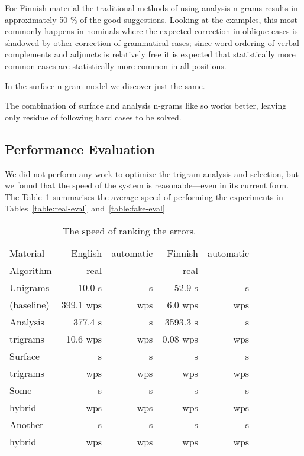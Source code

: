 \documentclass{llncs}
\begin{document}
For Finnish material the traditional methods of using analysis n-grams results
in approximately 50 \% of the good suggestions. Looking at the examples, this
most commonly happens in nominals where the expected correction in oblique
cases is shadowed by other correction of grammatical cases; since word-ordering
of verbal complements and adjuncts is relatively free it is expected that
statistically more common cases are statistically more common in all positions.

In the surface n-gram model we discover just the same.

The combination of surface and analysis n-grams like so works better, leaving
only residue of following hard cases to be solved.

\subsection{Performance Evaluation}

We did not perform any work to optimize the trigram analysis and selection,
but we found that the speed of the system is reasonable---even in its current
form. The Table~\ref{table:speed-eval} summarises the average
speed of performing the experiments in Tables~\ref{table:real-eval}~and~\ref{table:fake-eval}

\begin{table}[h]
    \caption{The speed of ranking the errors.
    \label{table:speed-eval}}
  \begin{center}
    \begin{scriptsize}
      \begin{tabular}{lrrrr}
        \hline
        Material  & English & automatic & Finnish & automatic \\
        Algorithm & real    &           & real    &           \\
        \hline
        Unigrams   &    10.0 s &      s & 52.9 s &     s  \\
        (baseline) & 399.1 wps &    wps & 6.0 wps &   wps  \\
        \hline
        Analysis &   377.4 s &     s & 3593.3 s &     s  \\
        trigrams & 10.6  wps &   wps & 0.08 wps &   wps  \\
        \hline
        Surface  &      s &     s &     s &     s  \\
        trigrams &    wps &   wps &   wps &   wps  \\
        \hline
        Some     &      s &     s &     s &     s  \\
        hybrid   &    wps &   wps &   wps &   wps  \\
        \hline
        Another  &      s &     s &     s &     s  \\
        hybrid   &    wps &   wps &   wps &   wps  \\
        \hline
      \end{tabular}
    \end{scriptsize}
  \end{center}
\end{table}
\end{document}
